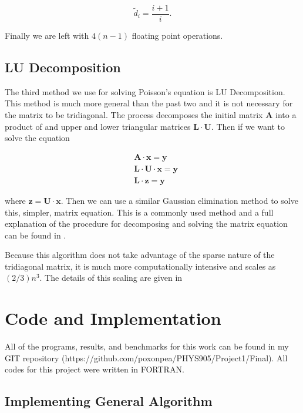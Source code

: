 \documentclass[%
oneside,                 %
final,                   %
10pt]{article}
\begin{document}
\begin{equation*}
\tilde{d}_i=\frac{i+1}{i}.
\end{equation*}

Finally we are left with $4(n-1)$ floating point operations.

\subsection{LU Decomposition}

The third method we use for solving Poisson's equation is LU Decomposition.  This method is much more general than the past two and it is not necessary for the matrix to be tridiagonal. The process decomposes the initial matrix $\mathbf{A}$ into a product of and upper and lower triangular matrices $\mathbf{L} \cdot \mathbf{U}$.  Then if we want to solve the equation

\begin{equation*}
\begin{split}
&\mathbf{A} \cdot \mathbf{x} = \mathbf{y} \\
&\mathbf{L} \cdot \mathbf{U} \cdot \mathbf{x} = \mathbf{y}\\
& \mathbf{L} \cdot \mathbf{z} = \mathbf{y}
\end{split}
\end{equation*}

where $\mathbf{z}=\mathbf{U} \cdot \mathbf{x}$.  Then we can use a similar Gaussian elimination method to solve this, simpler, matrix equation.  This is a commonly used method and a full explanation of the procedure for decomposing and solving the matrix equation can be found in \cite{LectureNotes}.

Because this algorithm does not take advantage of the sparse nature of the tridiagonal matrix, it is much more computationally intensive and scales as $(2/3) n^3$.  The details of this scaling are given in \cite{Chiarandini}


\section{Code and Implementation}

All of the programs, results, and benchmarks for this work can be found in my GIT repository (https://github.com/poxonpea/PHYS905/Project1/Final).  All codes for this project were written in FORTRAN.

\subsection{Implementing General Algorithm}
\end{document}
